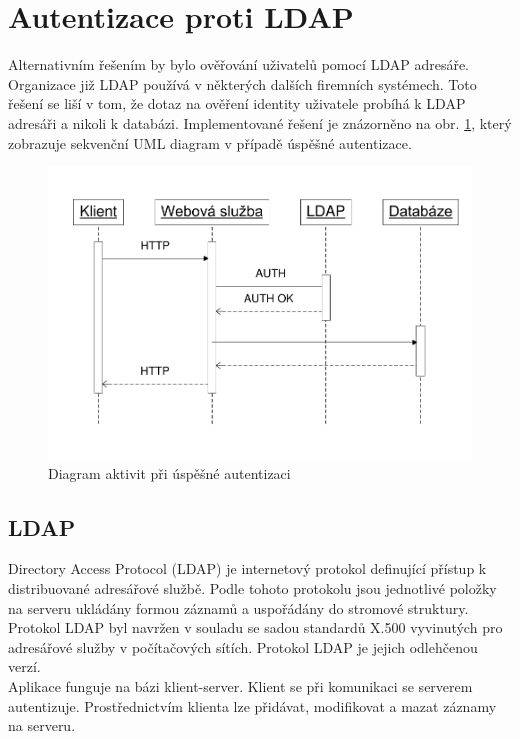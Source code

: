 \documentclass{diplomka}
\begin{document}
\section{Autentizace proti LDAP}
Alternativním řešením by bylo ověřování uživatelů pomocí LDAP adresáře. Organizace již LDAP používá v některých dalších firemních systémech. Toto řešení se liší v tom, že dotaz na ověření identity uživatele probíhá k LDAP adresáři a nikoli k databázi. Implementované řešení je znázorněno na obr. \ref{fig:authldap}, který zobrazuje sekvenční UML diagram v případě úspěšné autentizace.
\begin{figure}[H]
  \centering
  \includegraphics[scale=0.8]{visio/auth_ldap.pdf}
\caption{Diagram aktivit při úspěšné autentizaci}
\label{fig:authldap}
\end{figure}
\vspace{-6mm}
\subsection{LDAP}
 Directory Access Protocol (LDAP) je internetový protokol definující přístup k distribuované adresářové službě. Podle tohoto protokolu jsou jednotlivé položky na serveru ukládány formou záznamů a uspořádány do stromové struktury. Protokol LDAP byl navržen v souladu  se sadou standardů X.500 vyvinutých pro adresářové služby v počítačových sítích. Protokol LDAP je jejich odlehčenou verzí.\\ \indent
Aplikace funguje na bázi klient-server. Klient se při komunikaci se serverem autentizuje. Prostřednictvím klienta lze přidávat, modifikovat a mazat záznamy na serveru.
\end{document}
